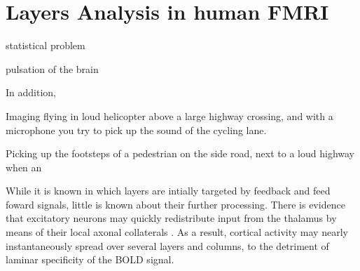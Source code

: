 \section{Layers Analysis in human FMRI}


statistical problem

pulsation of the brain 

In addition, 



Imaging flying in loud helicopter above a large highway crossing, and with a microphone you try to pick up the sound of the cycling lane.

Picking up the footsteps of a pedestrian on the side  road, next to a loud highway when an 



While it is known in which layers are intially targeted by feedback and feed foward signals, little is known about their further processing. There is evidence that excitatory neurons may quickly redistribute input from the thalamus by means of their local axonal collaterals \cite{Guy2017,ReyesPuerta2015}. As a result, cortical activity may nearly instantaneously spread over several layers and columns, to the detriment of laminar specificity of the BOLD signal.

\cite{Maass2014}
